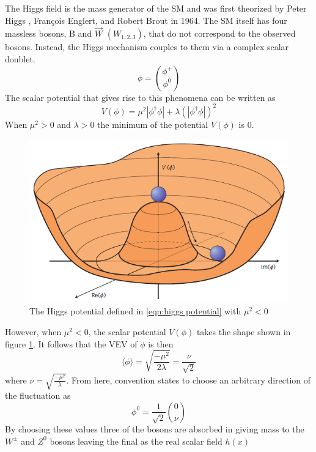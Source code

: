 		The Higgs field is the mass generator of the \gls{SM} and was first theorized by Peter Higgs \cite{Higgs-paper}, François Englert, and Robert Brout \cite{Englert-Brout} in 1964.  The \gls{SM} itself has four massless bosons, B and $\vec{W}$ $(W_{1,2,3})$, that do not correspond to the observed bosons. Instead, the Higgs mechanism couples to them via a complex scalar doublet. 
		\begin{equation}\label{eqn:scal doub} \phi = \binom{\phi^+}{\phi^0}\end{equation}
		The scalar potential that gives rise to this phenomena can be written as 
		\begin{equation}\label{eqn:higgs potential} V(\phi) = \mu^2 |\phi^{\dagger}\phi| + \lambda (|\phi^{\dagger}\phi|)^2\end{equation}
		When $\mu^2>0$ and $\lambda>0$ the minimum of the potential $V(\phi)$ is 0. 
		\begin{figure}[!ht] \centering \includegraphics[width=.7\textwidth,keepaspectratio=true]{chapters/chapter2_theory/images/higgspotential.png} \caption{The Higgs potential defined in \ref{eqn:higgs potential} with $\mu^2<0$ \cite{Higgs-phys}} \label{fig:higgs-potential}\end{figure}
		However, when $\mu^2<0$, the scalar potential $V(\phi)$ takes the shape shown in figure \ref{fig:higgs-potential}.
		It follows that the \gls{VEV} of $\phi$ is then 
		\begin{equation}\label{eqn:higgs vev} \langle \phi \rangle = \sqrt{\frac{-\mu^2}{2\lambda}} = \frac{\nu}{\sqrt{2}}	\end{equation}
		where $\nu = \sqrt{\frac{-\mu^2}{\lambda}}$.
		From here, convention states to choose an arbitrary direction of the fluctuation as 
		\begin{equation}\label{eqn:phi zero} \phi^0 = \frac{1}{\sqrt{2}} \binom{0}{\nu} \end{equation}
		By choosing these values three of the bosons are absorbed in giving mass to the $W^{\pm}$ and $Z^0$ bosons leaving the final as the real scalar field $h(x)$
